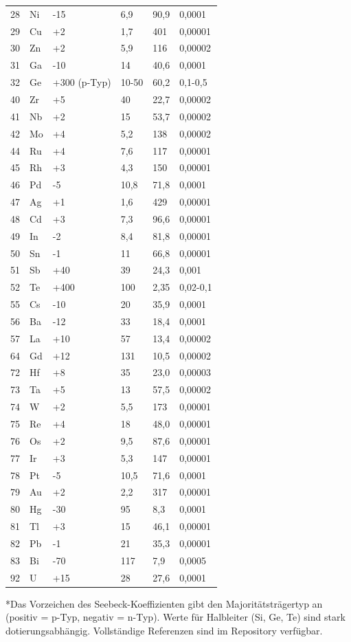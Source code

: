 \documentclass[12pt,a4paper]{article}
\begin{document}
\begin{longtable}{p{0.8cm}p{1.2cm}p{2.2cm}p{2.2cm}p{2.2cm}p{2.2cm}}
		28 & Ni & -15 & 6,9 & 90,9 & 0,0001 \\
		29 & Cu & +2 & 1,7 & 401 & 0,00001 \\
		30 & Zn & +2 & 5,9 & 116 & 0,00002 \\
		31 & Ga & -10 & 14 & 40,6 & 0,0001 \\
		32 & Ge & +300 (p-Typ) & 10-50 & 60,2 & 0,1-0,5 \\
		40 & Zr & +5 & 40 & 22,7 & 0,00002 \\
		41 & Nb & +2 & 15 & 53,7 & 0,00002 \\
		42 & Mo & +4 & 5,2 & 138 & 0,00002 \\
		44 & Ru & +4 & 7,6 & 117 & 0,00001 \\
		45 & Rh & +3 & 4,3 & 150 & 0,00001 \\
		46 & Pd & -5 & 10,8 & 71,8 & 0,0001 \\
		47 & Ag & +1 & 1,6 & 429 & 0,00001 \\
		48 & Cd & +3 & 7,3 & 96,6 & 0,00001 \\
		49 & In & -2 & 8,4 & 81,8 & 0,00001 \\
		50 & Sn & -1 & 11 & 66,8 & 0,00001 \\
		51 & Sb & +40 & 39 & 24,3 & 0,001 \\
		52 & Te & +400 & 100 & 2,35 & 0,02-0,1 \\
		55 & Cs & -10 & 20 & 35,9 & 0,0001 \\
		56 & Ba & -12 & 33 & 18,4 & 0,0001 \\
		57 & La & +10 & 57 & 13,4 & 0,00002 \\
		64 & Gd & +12 & 131 & 10,5 & 0,00002 \\
		72 & Hf & +8 & 35 & 23,0 & 0,00003 \\
		73 & Ta & +5 & 13 & 57,5 & 0,00002 \\
		74 & W  & +2 & 5,5 & 173 & 0,00001 \\
		75 & Re & +4 & 18 & 48,0 & 0,00001 \\
		76 & Os & +2 & 9,5 & 87,6 & 0,00001 \\
		77 & Ir & +3 & 5,3 & 147 & 0,00001 \\
		78 & Pt & -5 & 10,5 & 71,6 & 0,0001 \\
		79 & Au & +2 & 2,2 & 317 & 0,00001 \\
		80 & Hg & -30 & 95 & 8,3 & 0,0001 \\
		81 & Tl & +3 & 15 & 46,1 & 0,00001 \\
		82 & Pb & -1 & 21 & 35,3 & 0,00001 \\
		83 & Bi & -70 & 117 & 7,9 & 0,0005 \\
		92 & U  & +15 & 28 & 27,6 & 0,0001 \\
		\bottomrule
	\end{longtable}
	*Das Vorzeichen des Seebeck-Koeffizienten gibt den Majoritätsträgertyp an (positiv = p-Typ, negativ = n-Typ). Werte für Halbleiter (Si, Ge, Te) sind stark dotierungsabhängig. Vollständige Referenzen sind im Repository verfügbar.
	
\end{document}
